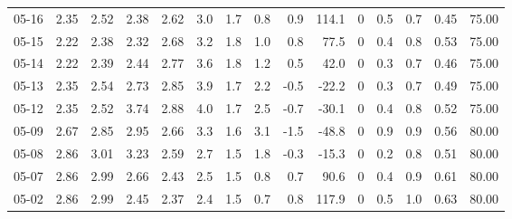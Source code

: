 \begin{threeparttable}
{\begin{tabular}{lrrrrrrrrrrrrrr}
  05-16 &          2.35 &          2.52 &          2.38 &        2.62 &                 3.0 &                1.7 &                 0.8 &        0.9 &        114.1 &              0 &                 0.5 &              0.7 &            0.45 &                  75.00 \\
  05-15 &          2.22 &          2.38 &          2.32 &        2.68 &                 3.2 &                1.8 &                 1.0 &        0.8 &         77.5 &              0 &                 0.4 &              0.8 &            0.53 &                  75.00 \\
  05-14 &          2.22 &          2.39 &          2.44 &        2.77 &                 3.6 &                1.8 &                 1.2 &        0.5 &         42.0 &              0 &                 0.3 &              0.7 &            0.46 &                  75.00 \\
  05-13 &          2.35 &          2.54 &          2.73 &        2.85 &                 3.9 &                1.7 &                 2.2 &       -0.5 &        -22.2 &              0 &                 0.3 &              0.7 &            0.49 &                  75.00 \\
  05-12 &          2.35 &          2.52 &          3.74 &        2.88 &                 4.0 &                1.7 &                 2.5 &       -0.7 &        -30.1 &              0 &                 0.4 &              0.8 &            0.52 &                  75.00 \\
  05-09 &          2.67 &          2.85 &          2.95 &        2.66 &                 3.3 &                1.6 &                 3.1 &       -1.5 &        -48.8 &              0 &                 0.9 &              0.9 &            0.56 &                  80.00 \\
  05-08 &          2.86 &          3.01 &          3.23 &        2.59 &                 2.7 &                1.5 &                 1.8 &       -0.3 &        -15.3 &              0 &                 0.2 &              0.8 &            0.51 &                  80.00 \\
  05-07 &          2.86 &          2.99 &          2.66 &        2.43 &                 2.5 &                1.5 &                 0.8 &        0.7 &         90.6 &              0 &                 0.4 &              0.9 &            0.61 &                  80.00 \\
  05-02 &          2.86 &          2.99 &          2.45 &        2.37 &                 2.4 &                1.5 &                 0.7 &        0.8 &        117.9 &              0 &                 0.5 &              1.0 &            0.63 &                  80.00 \\

\end{tabular}}
\end{threeparttable}
